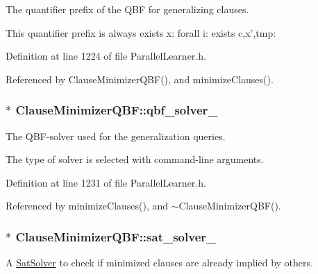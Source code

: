 The quantifier prefix of the Q\-B\-F for generalizing clauses. 

This quantifier prefix is always exists x\-: forall i\-: exists c,x',tmp\-: 

Definition at line 1224 of file Parallel\-Learner.\-h.



Referenced by Clause\-Minimizer\-Q\-B\-F(), and minimize\-Clauses().

\hypertarget{classClauseMinimizerQBF_abca59a55100d8667effffdd26da5c7f7}{
\subsubsection[{qbf\-\_\-solver\-\_\-}]{$\ast$ Clause\-Minimizer\-Q\-B\-F\-::qbf\-\_\-solver\-\_\-\hspace{0.3cm}{\ttfamily [protected]}}}\label{classClauseMinimizerQBF_abca59a55100d8667effffdd26da5c7f7}


The Q\-B\-F-\/solver used for the generalization queries. 

The type of solver is selected with command-\/line arguments. 

Definition at line 1231 of file Parallel\-Learner.\-h.



Referenced by minimize\-Clauses(), and $\sim$\-Clause\-Minimizer\-Q\-B\-F().

\hypertarget{classClauseMinimizerQBF_af0b9ee5117475b01e377f730fba6d4fb}{
\subsubsection[{sat\-\_\-solver\-\_\-}]{$\ast$ Clause\-Minimizer\-Q\-B\-F\-::sat\-\_\-solver\-\_\-\hspace{0.3cm}{\ttfamily [protected]}}}\label{classClauseMinimizerQBF_af0b9ee5117475b01e377f730fba6d4fb}


A \hyperlink{classSatSolver}{Sat\-Solver} to check if minimized clauses are already implied by others. 



